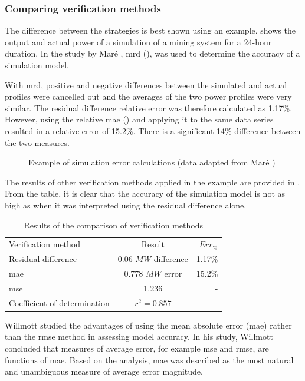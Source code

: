  		\subsubsection{Comparing verification methods}
 		The difference between the strategies is best shown using an example.  shows the output and actual power of a simulation of a mining system for a 24-hour duration. In the study by Maré \cite{Mare2016PhD}, \gls{mrd} (), was used to determine the accuracy of a simulation model.
 		\par 
 		 With \gls{mrd}, positive and negative differences between the simulated and actual profiles were cancelled out and the averages of the two power profiles were very similar. The residual difference relative error was therefore calculated as 1.17\%. However, using the relative \gls{mae} ()  and applying it to the same data series resulted in a relative error of 15.2\%. There is a significant 14\% difference between the two measures. 
 		  \par
 	\begin{figure}[!htbp]
 		\centering
 		
 		\caption[Example of simulation error calculations]{Example of simulation error calculations (data adapted from Maré \cite{Mare2016PhD})}
 		\label{fig:Philipp Difference verify}
 	\end{figure}

 The results of other verification methods applied in the example are provided in . From the table, it is clear that the accuracy of the simulation model is not as high as when it was interpreted using the residual difference alone.\\
 	\par 
 \begin{table}[!htbp]
 	\caption{Results of the comparison of verification methods}
 	\centering
 	\begin{tabular}{lcr}
 		\hline
 		Verification method & Result & $Err_{\%}$\\
 		\hhline{===}
 		Residual difference     & 0.06 $MW$ difference & 1.17\% \\
 		\gls{mae} 					 & 0.778 $MW$ error & 15.2\% \\
 		\gls{mse} 				   & 1.236  & -\\
 		Coefficient of determination & $r^2 =0.857$  & -\\
 		\hline
 	\end{tabular} 
 \label{Philip verification table}
 \end{table}
 	Willmott \cite{willmott2005advantages} studied the advantages of using the mean absolute error (\gls{mae}) rather than the \gls{rmse} method in assessing model accuracy. In his study, Willmott concluded that measures of average error, for example \gls{mse} and \gls{rmse}, are functions of \gls{mae}. Based on the analysis, \gls{mae} was described as the most natural and unambiguous measure of average error magnitude.

